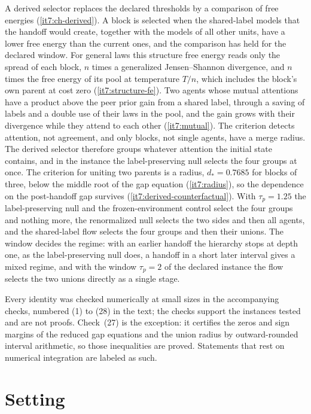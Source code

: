 \documentclass[11pt,letterpaper]{report}
\begin{document}
A derived selector replaces the declared thresholds by a comparison of free energies (\cref{it7:ch-derived}). A block is selected when the shared-label models that the handoff would create, together with the models of all other units, have a lower free energy than the current ones, and the comparison has held for the declared window. For general laws this structure free energy reads only the spread of each block, $n$ times a generalized Jensen--Shannon divergence, and $n$ times the free energy of its pool at temperature $T/n$, which includes the block's own parent at cost zero (\cref{it7:structure-fe}). Two agents whose mutual attentions have a product above the peer prior gain from a shared label, through a saving of labels and a double use of their laws in the pool, and the gain grows with their divergence while they attend to each other (\cref{it7:mutual}). The criterion detects attention, not agreement, and only blocks, not single agents, have a merge radius. The derived selector therefore groups whatever attention the initial state contains, and in the instance the label-preserving null selects the four groups at once. The criterion for uniting two parents is a radius, $d_*=0.7685$ for blocks of three, below the middle root of the gap equation (\cref{it7:radius}), so the dependence on the post-handoff gap survives (\cref{it7:derived-counterfactual}). With $\tau_p=1.25$ the label-preserving null and the frozen-environment control select the four groups and nothing more, the renormalized null selects the two sides and then all agents, and the shared-label flow selects the four groups and then their unions. The window decides the regime: with an earlier handoff the hierarchy stops at depth one, as the label-preserving null does, a handoff in a short later interval gives a mixed regime, and with the window $\tau_p=2$ of the declared instance the flow selects the two unions directly as a single stage.

Every identity was checked numerically at small sizes in the accompanying checks, numbered (1) to (28) in the text; the checks support the instances tested and are not proofs. Check~(27) is the exception: it certifies the zeros and sign margins of the reduced gap equations and the union radius by outward-rounded interval arithmetic, so those inequalities are proved. Statements that rest on numerical integration are labeled as such.

\begingroup
\small
\tableofcontents
\endgroup
\clearpage
{}

\chapter{Setting}
\label{it7:ch-setting}
\end{document}
